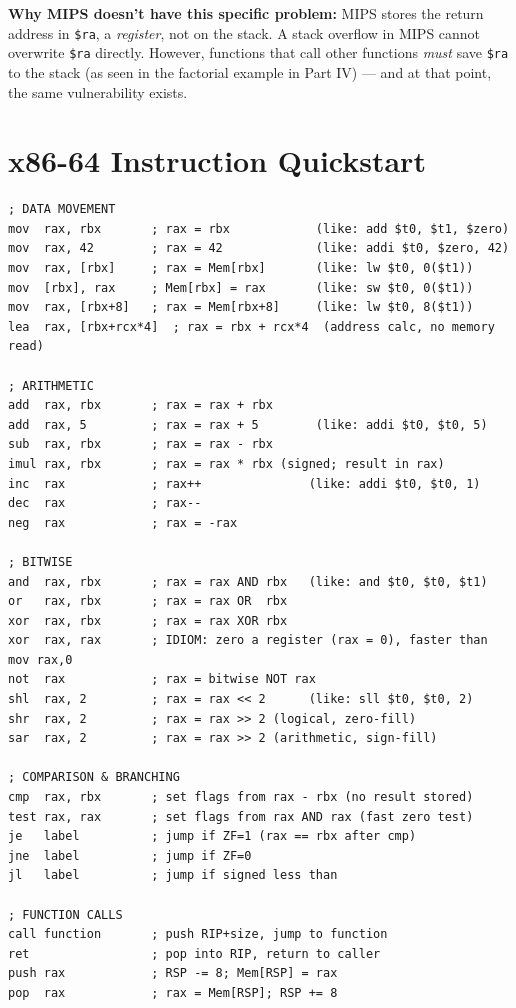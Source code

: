 \documentclass[11pt, letterpaper]{article}
\begin{document}
\begin{tcolorbox}[colback=part6bg, colframe=sectionred, arc=3pt, boxrule=1pt]
\textbf{Why MIPS doesn't have this specific problem:} MIPS stores the return address in \texttt{\$ra}, a \emph{register}, not on the stack. A stack overflow in MIPS cannot overwrite \texttt{\$ra} directly. However, functions that call other functions \emph{must} save \texttt{\$ra} to the stack (as seen in the factorial example in Part IV) --- and at that point, the same vulnerability exists.
\end{tcolorbox}

\section*{x86-64 Instruction Quickstart}

\begin{lstlisting}[style=x86, caption={Most common x86-64 instructions with MIPS comparison}]
; DATA MOVEMENT
mov  rax, rbx       ; rax = rbx            (like: add $t0, $t1, $zero)
mov  rax, 42        ; rax = 42             (like: addi $t0, $zero, 42)
mov  rax, [rbx]     ; rax = Mem[rbx]       (like: lw $t0, 0($t1))
mov  [rbx], rax     ; Mem[rbx] = rax       (like: sw $t0, 0($t1))
mov  rax, [rbx+8]   ; rax = Mem[rbx+8]     (like: lw $t0, 8($t1))
lea  rax, [rbx+rcx*4]  ; rax = rbx + rcx*4  (address calc, no memory read)

; ARITHMETIC
add  rax, rbx       ; rax = rax + rbx
add  rax, 5         ; rax = rax + 5        (like: addi $t0, $t0, 5)
sub  rax, rbx       ; rax = rax - rbx
imul rax, rbx       ; rax = rax * rbx (signed; result in rax)
inc  rax            ; rax++               (like: addi $t0, $t0, 1)
dec  rax            ; rax--
neg  rax            ; rax = -rax

; BITWISE
and  rax, rbx       ; rax = rax AND rbx   (like: and $t0, $t0, $t1)
or   rax, rbx       ; rax = rax OR  rbx
xor  rax, rbx       ; rax = rax XOR rbx
xor  rax, rax       ; IDIOM: zero a register (rax = 0), faster than mov rax,0
not  rax            ; rax = bitwise NOT rax
shl  rax, 2         ; rax = rax << 2      (like: sll $t0, $t0, 2)
shr  rax, 2         ; rax = rax >> 2 (logical, zero-fill)
sar  rax, 2         ; rax = rax >> 2 (arithmetic, sign-fill)

; COMPARISON & BRANCHING
cmp  rax, rbx       ; set flags from rax - rbx (no result stored)
test rax, rax       ; set flags from rax AND rax (fast zero test)
je   label          ; jump if ZF=1 (rax == rbx after cmp)
jne  label          ; jump if ZF=0
jl   label          ; jump if signed less than

; FUNCTION CALLS
call function       ; push RIP+size, jump to function
ret                 ; pop into RIP, return to caller
push rax            ; RSP -= 8; Mem[RSP] = rax
pop  rax            ; rax = Mem[RSP]; RSP += 8
\end{lstlisting}
\end{document}
